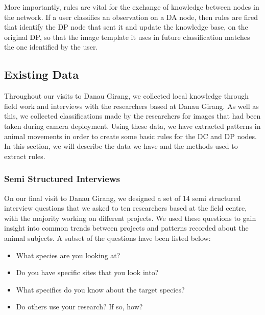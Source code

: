 		More importantly, rules are vital for the exchange of knowledge between nodes in the network. If a user classifies an observation on a DA node, then rules are fired that identify the DP node that sent it and update the knowledge base, on the original DP, so that the image template it uses in future classification matches the one identified by the user.
		
		\subsection{Existing Data}
			Throughout our visits to Danau Girang, we collected local knowledge through field work and interviews with the researchers based at Danau Girang. As well as this, we collected classifications made by the researchers for images that had been taken during camera deployment. Using these data, we have extracted patterns in animal movements in order to create some basic rules for the DC and DP nodes. In this section, we will describe the data we have and the methods used to extract rules.
			
			\subsubsection{Semi Structured Interviews}
			On our final visit to Danau Girang, we designed a set of 14 semi structured interview questions that we asked to ten researchers based at the field centre, with the majority working on different projects. We used these questions to gain insight into common trends between projects and patterns recorded about the animal subjects. A subset of the questions have been listed below:
			
			\begin{itemize}
				\item What species are you looking at?
				\item Do you have specific sites that you look into?
				\item What specifics do you know about the target species?
				\item Do others use your research? If so, how?
			\end{itemize}
			

